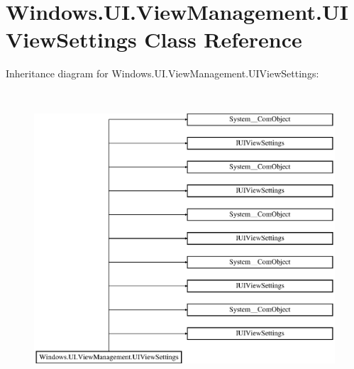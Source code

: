 \hypertarget{class_windows_1_1_u_i_1_1_view_management_1_1_u_i_view_settings}{}\section{Windows.\+U\+I.\+View\+Management.\+U\+I\+View\+Settings Class Reference}
\label{class_windows_1_1_u_i_1_1_view_management_1_1_u_i_view_settings}
Inheritance diagram for Windows.\+U\+I.\+View\+Management.\+U\+I\+View\+Settings\+:\begin{figure}[H]
\begin{center}
\leavevmode
\includegraphics[height=11.000000cm]{class_windows_1_1_u_i_1_1_view_management_1_1_u_i_view_settings}
\end{center}
\end{figure}
